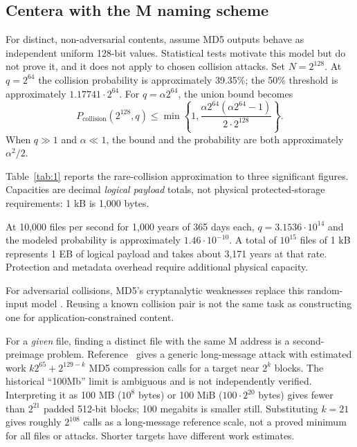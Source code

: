 \subsection{Centera with the M naming
scheme}\label{sec:5.2}\label{centera-with-the-m-naming-scheme}

For distinct, non-adversarial contents, assume MD5 outputs behave as
independent uniform 128-bit values. Statistical tests motivate this model
but do not prove it, and it does not apply to chosen collision attacks.
Set $N=2^{128}$. At $q=2^{64}$ the collision probability is approximately
39.35\%; the 50\% threshold is approximately $1.17741\cdot2^{64}$.
For $q=\alpha2^{64}$, the union bound becomes
\begin{equation}\label{eq:5.4}
P_{\mathrm{collision}}(2^{128},q)
 \le\min\left\{1,\frac{\alpha2^{64}(\alpha2^{64}-1)}{2\cdot2^{128}}\right\}.
\end{equation}
When $q\gg1$ and $\alpha\ll1$, the bound and the probability are both
approximately $\alpha^2/2$.

Table~\ref{tab:1} reports the rare-collision approximation to three
significant figures. Capacities are decimal \emph{logical payload} totals,
not physical protected-storage requirements: 1 kB is 1,000 bytes.


At 10,000 files per second for 1,000 years of 365 days each,
$q=3.1536\cdot10^{14}$ and the modeled probability is approximately
$1.46\cdot10^{-10}$. A total of $10^{15}$ files of 1 kB represents 1 EB
of logical payload and takes about 3,171 years at that rate. Protection
and metadata overhead require additional physical capacity.

For adversarial collisions, MD5's cryptanalytic weaknesses replace this
random-input model \cite{ref30,ref31}. Reusing a known collision pair is
not the same task as constructing one for application-constrained content.

For a \emph{given} file, finding a distinct file with the same M address
is a second-preimage problem. Reference~\cite{ref11} gives a generic
long-message attack with estimated work
$k2^{65}+2^{129-k}$ MD5 compression calls for a target near $2^k$ blocks.
The historical ``100Mb'' limit is ambiguous and is not independently
verified. Interpreting it as 100 MB ($10^8$ bytes) or 100 MiB
($100\cdot2^{20}$ bytes) gives fewer than $2^{21}$ padded 512-bit blocks;
100 megabits is smaller still. Substituting $k=21$ gives roughly
$2^{108}$ calls as a long-message reference scale, not a proved minimum
for all files or attacks. Shorter targets have different work estimates.

